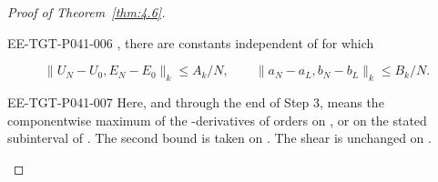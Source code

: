 \begin{proof}[Proof of Theorem~\ref{thm:4.6}]
\begin{EESegment}{EE-TGT-P041-006}
, there are constants independent of
 for which
\end{EESegment}
\begin{equation}
\lVert U_N-U_0,E_N-E_0\rVert_k\le A_k/N,
\qquad
\lVert a_N-a_L,b_N-b_L\rVert_k\le B_k/N.
\tag{4.39}\label{eq:4.39}
\end{equation}
\begin{EESegment}{EE-TGT-P041-007}
Here, and through the end of Step 3,  means the
componentwise maximum of the -derivatives of orders
 on
, or on the stated subinterval of
. The second bound is taken on
. The shear is unchanged on
.
\end{EESegment}


\end{proof}
